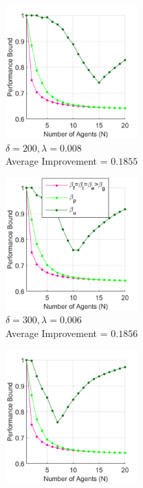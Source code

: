 \documentclass[conference]{IEEEtran}
\begin{document}
\begin{figure}[t]
    \centering
    \begin{subfigure}[t]{0.33\textwidth}
        \centering
        \captionsetup{justification=centering}
        \includegraphics[width=2in]{Figures/Maze4.png}
        \caption{$\delta = 200, \lambda = 0.008$ \\ Average Improvement = $0.1855$}
    \end{subfigure}%
    \hfill
    \begin{subfigure}[t]{0.33\textwidth}
        \centering
        \captionsetup{justification=centering}
        \includegraphics[width=2in]{Figures/Maze1.png}
        \caption{$\delta = 300, \lambda = 0.006$ \\ Average Improvement = $0.1856$}
    \end{subfigure}
    \hfill
    \begin{subfigure}[t]{0.33\textwidth}
        \centering
        \captionsetup{justification=centering}
        \includegraphics[width=2in]{Figures/Maze2.png}

\end{subfigure}
\end{figure}
\end{document}
